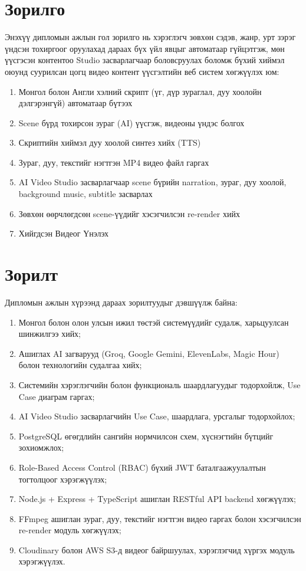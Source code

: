 \section{Зорилго}

Энэхүү дипломын ажлын гол зорилго нь хэрэглэгч зөвхөн сэдэв, жанр, урт зэрэг үндсэн тохиргоог оруулахад дараах бүх үйл явцыг автоматаар гүйцэтгэж, мөн үүсгэсэн контентоо Studio засварлагчаар боловсруулах боломж бүхий хиймэл оюунд суурилсан цогц видео контент үүсгэлтийн веб систем хөгжүүлэх юм:

\begin{enumerate}
\item Монгол болон Англи хэлний скрипт (үг, дүр зураглал, дуу хоолойн дэлгэрэнгүй) автоматаар бүтээх
\item Scene бүрд тохирсон зураг (AI) үүсгэж, видеоны үндэс болгох
\item Скриптийн хиймэл дуу хоолой синтез хийх (TTS)
\item Зураг, дуу, текстийг нэгтгэн MP4 видео файл гаргах
\item AI Video Studio засварлагчаар scene бүрийн narration, зураг, дуу хоолой, background music, subtitle засварлах
\item Зөвхөн өөрчлөгдсөн scene-үүдийг хэсэгчилсэн re-render хийх
\item Хийгдсэн Видеог Үнэлэх
\end{enumerate}

\section{Зорилт}

Дипломын ажлын хүрээнд дараах зорилтуудыг дэвшүүлж байна:

\begin{enumerate}
\item Монгол болон олон улсын ижил төстэй системүүдийг судалж, харьцуулсан шинжилгээ хийх;
\item Ашиглах AI загварууд (Groq, Google Gemini, ElevenLabs, Magic Hour) болон технологийн судалгаа хийх;
\item Системийн хэрэглэгчийн болон функциональ шаардлагуудыг тодорхойлж, Use Case диаграм гаргах;
\item AI Video Studio засварлагчийн Use Case, шаардлага, урсгалыг тодорхойлох;
\item PostgreSQL өгөгдлийн сангийн нормчилсон схем, хүснэгтийн бүтцийг зохиомжлох;
\item Role-Based Access Control (RBAC) бүхий JWT баталгаажуулалтын тогтолцоог хэрэгжүүлэх;
\item Node.js + Express + TypeScript ашиглан RESTful API backend хөгжүүлэх;
\item FFmpeg ашиглан зураг, дуу, текстийг нэгтгэн видео гаргах болон хэсэгчилсэн re-render модуль хөгжүүлэх;
\item Cloudinary болон AWS S3-д видеог байршуулах, хэрэглэгчид хүргэх модуль хэрэгжүүлэх.
\end{enumerate}

